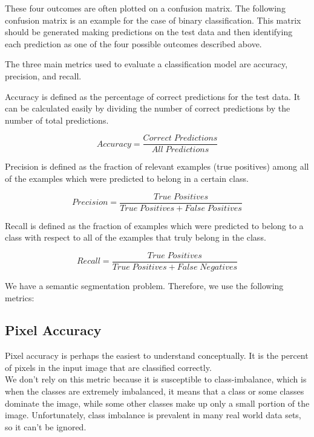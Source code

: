 These four outcomes are often plotted on a confusion matrix. The following confusion matrix is an example for the case of binary classification. This matrix should be generated making predictions on the test data and then identifying each prediction as one of the four possible outcomes described above.

\vspace{0.1in}



The three main metrics used to evaluate a classification model are accuracy, precision, and recall.

Accuracy is defined as the percentage of correct predictions for the test data. It can be calculated easily by dividing the number of correct predictions by the number of total predictions.

\begin{equation}
  Accuracy = \frac{Correct\; Predictions}{All\; Predictions}
\end{equation}

Precision is defined as the fraction of relevant examples (true positives) among all of the examples which were predicted to belong in a certain class.

\begin{equation}
  Precision = \frac{True\; Positives}{True\; Positives + False\; Positives}
\end{equation}

Recall is defined as the fraction of examples which were predicted to belong to a class with respect to all of the examples that truly belong in the class.

\begin{equation}
  Recall = \frac{True\; Positives}{True\; Positives + False\; Negatives}
\end{equation}

We have a semantic segmentation problem. Therefore, we use the following metrics:

\subsection{Pixel Accuracy}
Pixel accuracy is perhaps the easiest to understand conceptually. It is the percent of pixels in the input image that are classified correctly.\\

We don't rely on this metric because it is susceptible to class-imbalance, which is when the classes are extremely imbalanced, it means that a class or some classes dominate the image, while some other classes make up only a small portion of the image. Unfortunately, class imbalance is prevalent in many real world data sets, so it can’t be ignored.\\

